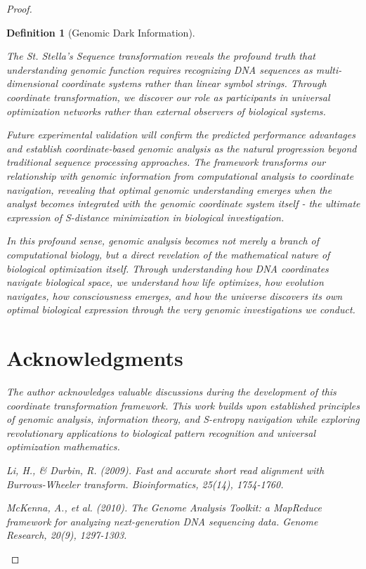 \documentclass[12pt,a4paper]{article}
\newtheorem{definition}{Definition}
\begin{document}
\begin{proof}
\begin{definition}[Genomic Dark Information]
\begin{algorithm}[H]
The St. Stella's Sequence transformation reveals the profound truth that understanding genomic function requires recognizing DNA sequences as multi-dimensional coordinate systems rather than linear symbol strings. Through coordinate transformation, we discover our role as participants in universal optimization networks rather than external observers of biological systems.

Future experimental validation will confirm the predicted performance advantages and establish coordinate-based genomic analysis as the natural progression beyond traditional sequence processing approaches. The framework transforms our relationship with genomic information from computational analysis to coordinate navigation, revealing that optimal genomic understanding emerges when the analyst becomes integrated with the genomic coordinate system itself - the ultimate expression of S-distance minimization in biological investigation.

In this profound sense, genomic analysis becomes not merely a branch of computational biology, but a direct revelation of the mathematical nature of biological optimization itself. Through understanding how DNA coordinates navigate biological space, we understand how life optimizes, how evolution navigates, how consciousness emerges, and how the universe discovers its own optimal biological expression through the very genomic investigations we conduct.

\section*{Acknowledgments}

The author acknowledges valuable discussions during the development of this coordinate transformation framework. This work builds upon established principles of genomic analysis, information theory, and S-entropy navigation while exploring revolutionary applications to biological pattern recognition and universal optimization mathematics.


\begin{thebibliography}{99}

Li, H., \& Durbin, R. (2009). Fast and accurate short read alignment with Burrows-Wheeler transform. \textit{Bioinformatics}, 25(14), 1754-1760.

McKenna, A., et al. (2010). The Genome Analysis Toolkit: a MapReduce framework for analyzing next-generation DNA sequencing data. \textit{Genome Research}, 20(9), 1297-1303.


\end{thebibliography}
\end{algorithm}
\end{definition}
\end{proof}
\end{document}

